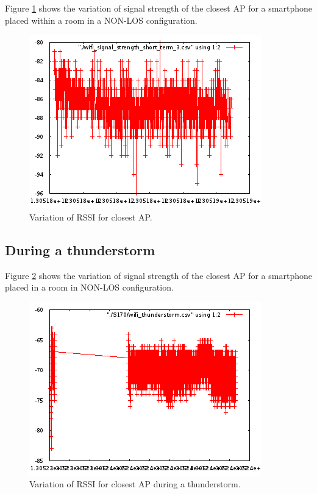 Figure \ref{fig:closestAPshortterm} shows the variation of signal strength of 
the closest AP for a smartphone placed within a room in a NON-LOS configuration.

\begin{figure}\centering
    \includegraphics{figures/short_term_wifi.png}
    \caption{Variation of RSSI for closest AP. \label{fig:closestAPshortterm}}
\end{figure}


\subsection{During a thunderstorm}

Figure \ref{fig:closestAPthunderstorm} shows the variation of signal strength of
the closest AP for a smartphone placed in a room in NON-LOS configuration.

\begin{figure}\centering
    \includegraphics{figures/wifi_thunderstorm.png}
    \caption{Variation of RSSI for closest AP during a thunderstorm. \label{fig:closestAPthunderstorm}}
\end{figure}

